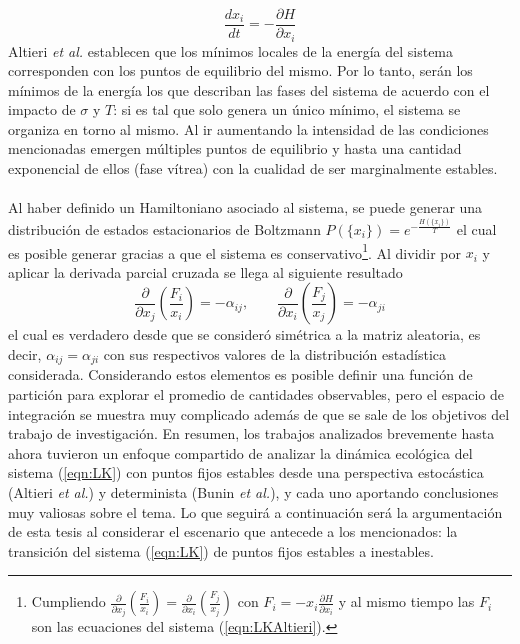 \begin{equation}\label{eqn:Gradiente}
	\frac{dx_i}{dt}=-\frac{\partial H}{\partial x_i}
\end{equation}
Altieri \textit{et al.} establecen que los mínimos locales de la energía del sistema corresponden con los puntos de equilibrio del mismo. Por lo tanto, serán los mínimos de la energía los que describan las fases del sistema de acuerdo con el impacto de $\sigma$ y $T$: si es tal que solo genera un único mínimo, el sistema se organiza en torno al mismo. Al ir aumentando la intensidad de las condiciones mencionadas emergen múltiples puntos de equilibrio y hasta una cantidad exponencial de ellos (fase vítrea) con la cualidad de ser marginalmente estables. \\
\\
Al haber definido un Hamiltoniano asociado al sistema, se puede generar una distribución de estados estacionarios de Boltzmann $P(\{ x_i\})=e^{-\frac{H(\{x_i\})}{T}}$ el cual es posible generar gracias a que el sistema es conservativo\footnote{Cumpliendo
$\frac{\partial}{\partial x_j}\left (\frac{F_i}{x_i}\right )=\frac{\partial}{\partial x_i}\left (\frac{F_j}{x_j}\right )$
con $F_i=-x_i\frac{\partial H}{\partial x_i}$ y al mismo tiempo las $F_i$ son las ecuaciones del sistema (\ref{eqn:LKAltieri}).}. Al dividir por $x_i$ y aplicar la derivada parcial cruzada se llega al siguiente resultado
\begin{equation}\label{eqn:Conservativo}
	\frac{\partial}{\partial x_j}\left (\frac{F_i}{x_i}\right )=-\alpha_{ij},\qquad\frac{\partial}{\partial x_i}\left (\frac{F_j}{x_j}\right )=-\alpha_{ji}
\end{equation}
el cual es verdadero desde que se consideró simétrica a la matriz aleatoria, es decir, $\alpha_{ij}=\alpha_{ji}$ con sus respectivos valores de la distribución estadística considerada. Considerando estos elementos es posible definir una función de partición para explorar el promedio de cantidades observables, pero el espacio de integración se muestra muy complicado además de que se sale de los objetivos del trabajo de investigación. En resumen, los trabajos analizados brevemente hasta ahora tuvieron un enfoque compartido de analizar la dinámica ecológica del sistema (\ref{eqn:LK}) con puntos fijos estables desde una perspectiva estocástica (Altieri \textit{et al.}) y determinista (Bunin \textit{et al.}), y cada uno aportando conclusiones muy valiosas sobre el tema. Lo que seguirá a continuación será la argumentación de esta tesis al considerar el escenario que antecede a los mencionados: la transición del sistema (\ref{eqn:LK}) de puntos fijos estables a inestables.
